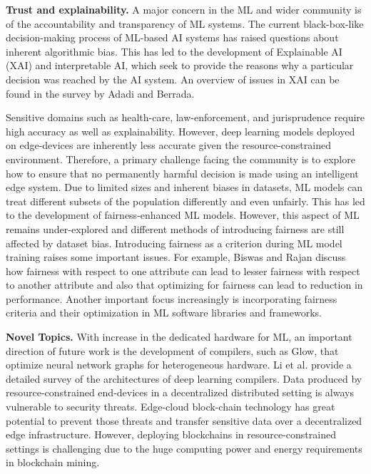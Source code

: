 \documentclass[letterpaper, 10 pt, conference]{ieeeconf}
\begin{document}
\textbf{Trust and explainability.} A major concern in the ML and wider community is of the accountability and transparency of ML systems. The current black-box-like decision-making process of ML-based AI systems has raised questions about inherent algorithmic bias\cite{Ribeiro_Singh_Guestrin_2016}. This has led to the development of Explainable AI (XAI) and interpretable AI, which seek to provide the reasons why a particular decision was reached by the AI system. An overview of issues in XAI can be found in the survey by Adadi and Berrada\cite{Adadi_Berrada_2018}.

Sensitive domains such as health-care, law-enforcement, and jurisprudence require high accuracy as well as explainability. However, deep learning models deployed on edge-devices are inherently less accurate given the resource-constrained environment. Therefore, a primary challenge facing the community is to explore how to ensure that no permanently harmful decision is made using an intelligent edge system. Due to limited sizes and inherent biases in datasets, ML models can treat different subsets of the population differently and even unfairly\cite{Simonite}. This has led to the development of fairness-enhanced ML models. However, this aspect of ML remains under-explored and different methods of introducing fairness are still affected by dataset bias\cite{Friedler_Scheidegger_Venkatasubramanian_Choudhary_Hamilton_Roth_2019}. Introducing fairness as a criterion during ML model training raises some important issues. For example, Biswas and Rajan discuss how fairness with respect to one attribute can lead to lesser fairness with respect to another attribute and also that optimizing for fairness can lead to reduction in performance\cite{Biswas_Rajan_2020}. Another important focus increasingly is incorporating fairness criteria and their optimization in ML software libraries and frameworks.

\textbf{Novel Topics.} With increase in the dedicated hardware for ML, an important direction of future work is the development of compilers, such as Glow\cite{Rotem_Fix_Abdulrasool_Catron_Deng_Dzhabarov_Gibson_Hegeman_Lele_Levenstein_et}, that optimize neural network graphs for heterogeneous hardware. Li et al. provide a detailed survey of the architectures of deep learning compilers\cite{Li_Liu_Liu_Sun_You_Yang_Luan_Gan_Yang_Qian_2021}. Data produced by resource-constrained end-devices in a decentralized distributed setting is always vulnerable to security threats. Edge-cloud block-chain technology has great potential to prevent those threats and transfer sensitive data over a decentralized edge infrastructure. However, deploying blockchains in resource-constrained settings is challenging due to the huge computing power and energy requirements in blockchain mining\cite{Wang_Han_Leung_Niyato_Yan_Chen_2020}.
\end{document}
